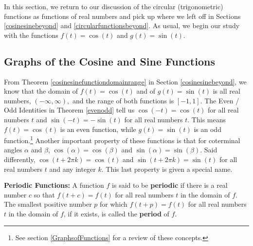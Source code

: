 

\setcounter{footnote}{0}

\label{TrigGraphs}

In this section, we return to our discussion of the circular (trigonometric) functions as functions of real numbers and pick up where we left off in Sections \ref{cosinesinebeyond} and \ref{circularfunctionsbeyond}.  As usual, we begin our study with the functions $f(t) = \cos(t)$ and $g(t) = \sin(t)$.  

\subsection{Graphs of the Cosine and Sine Functions}

From Theorem \ref{cosinesinefunctiondomainrange} in Section \ref{cosinesinebeyond}, we know that the domain of $f(t) = \cos(t)$ and of $g(t) = \sin(t)$ is all real numbers, $(-\infty, \infty),$ and the range of both functions is $[-1,1]$.  The Even / Odd Identities in Theorem \ref{evenodd} tell us $\cos(-t) = \cos(t)$ for all real numbers $t$ and $\sin(-t) = -\sin(t)$ for all real numbers $t$.  This means $f(t) = \cos(t)$ is an even function, while $g(t) = \sin(t)$ is an odd function.\footnote{See section \ref{GraphsofFunctions} for a review of these concepts.}  Another important property of these  functions is that for coterminal angles $\alpha$ and $\beta$, $\cos(\alpha) = \cos(\beta)$ and $\sin(\alpha) = \sin(\beta)$.  Said differently,  $\cos(t + 2\pi k) = \cos(t)$ and $\sin(t + 2\pi k) = \sin(t)$ for all real numbers $t$ and any integer $k$.  This last property is given a special name.

\smallskip

\colorbox{ResultColor}{\bbm

\begin{defn} \label{periodic} \textbf{Periodic Functions:} A function $f$ is said to be \textbf{periodic}  if there is a real number $c$ so that $f(t+c) = f(t)$ for all real numbers $t$ in the domain of $f$.  The smallest positive number $p$ for which $f(t+p) = f(t)$ for all real numbers $t$ in the domain of $f$, if it exists, is called the \textbf{period} of $f$. 

\end{defn}

\ebm}

\medskip

